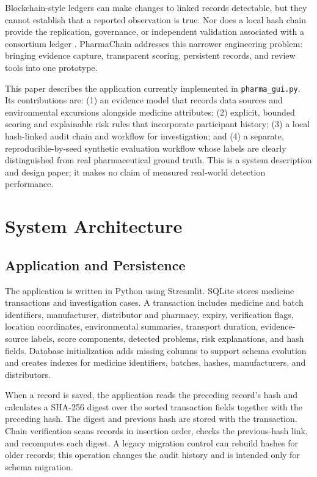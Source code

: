 \documentclass[conference]{IEEEtran}
\begin{document}
Blockchain-style ledgers can make changes to linked records detectable, but they cannot establish that a reported observation is true. Nor does a local hash chain provide the replication, governance, or independent validation associated with a consortium ledger \cite{nist}. PharmaChain addresses this narrower engineering problem: bringing evidence capture, transparent scoring, persistent records, and review tools into one prototype.

This paper describes the application currently implemented in \texttt{pharma\_gui.py}. Its contributions are: (1) an evidence model that records data sources and environmental excursions alongside medicine attributes; (2) explicit, bounded scoring and explainable risk rules that incorporate participant history; (3) a local hash-linked audit chain and workflow for investigation; and (4) a separate, reproducible-by-seed synthetic evaluation workflow whose labels are clearly distinguished from real pharmaceutical ground truth. This is a system description and design paper; it makes no claim of measured real-world detection performance.

\section{System Architecture}
\subsection{Application and Persistence}
The application is written in Python using Streamlit. SQLite stores medicine transactions and investigation cases. A transaction includes medicine and batch identifiers, manufacturer, distributor and pharmacy, expiry, verification flags, location coordinates, environmental summaries, transport duration, evidence-source labels, score components, detected problems, risk explanations, and hash fields. Database initialization adds missing columns to support schema evolution and creates indexes for medicine identifiers, batches, hashes, manufacturers, and distributors.

When a record is saved, the application reads the preceding record's hash and calculates a SHA-256 digest over the sorted transaction fields together with the preceding hash. The digest and previous hash are stored with the transaction. Chain verification scans records in insertion order, checks the previous-hash link, and recomputes each digest. A legacy migration control can rebuild hashes for older records; this operation changes the audit history and is intended only for schema migration.
\end{document}
